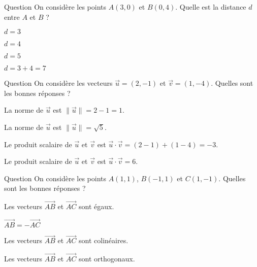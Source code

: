 

\begin{multi}[multiple,feedback=
{D'abord, \(\overrightarrow{AB}=(-3,4)\). Donc \(d=\sqrt{(-3)^2+4^2}=\sqrt{25}=5\).
}]{Question}
On considère les points \(A(3,0)\) et \(B(0,4)\). Quelle est la distance \(d\) entre \(A\) et \(B\) ?

    \item \(d=3\)
    \item \(d=4\)
    \item* \(d=5\)
    \item \(d=3+4=7\)
\end{multi}


\begin{multi}[multiple,feedback=
{Penser aux définitions : si \(\vec{u}=(x,y)\) et \(\vec{v}=(x',y')\) alors
\(\vec{u}\cdot \vec{v} = xx'+yy'\) et \(\|\vec{u}\| = \sqrt{\vec{u}\cdot \vec{u}}
= \sqrt{x^2+y^2}\).
}]{Question}
On considère les vecteurs \(\vec{u}=(2,-1)\) et \(\vec{v}=(1,-4)\). Quelles sont les bonnes réponses ?

    \item La norme de \(\vec{u}\) est \(\|\vec{u}\|=2-1=1\).
    \item* La norme de \(\vec{u}\) est \(\|\vec{u}\|=\sqrt{5}\).
    \item Le produit scalaire de \(\vec{u}\) et \(\vec{v}\) est \(\vec{u}\cdot \vec{v}=(2-1)+(1-4)=-3\).
    \item* Le produit scalaire de \(\vec{u}\) et \(\vec{v}\) est \(\vec{u}\cdot \vec{v}=6\).
\end{multi}


\begin{multi}[multiple,feedback=
{D'abord, \(\overrightarrow{AB}=(-2,0)\) et \(\overrightarrow{AC}=(0,-2)\), et puis le produit scalaire \(\overrightarrow{AB}\cdot\overrightarrow{AC}\) est nul. Donc \(\overrightarrow{AB}\) et \(\overrightarrow{AC}\) sont orthogonaux.
}]{Question}
On considère les points \(A(1,1)\), \(B(-1,1)\) et \(C(1,-1)\). Quelles sont les bonnes réponses ?

    \item Les vecteurs \(\overrightarrow{AB}\) et \(\overrightarrow{AC}\) sont égaux.
    \item \(\overrightarrow{AB}=-\overrightarrow{AC}\)
    \item Les vecteurs \(\overrightarrow{AB}\) et \(\overrightarrow{AC}\) sont colinéaires.
    \item* Les vecteurs \(\overrightarrow{AB}\) et \(\overrightarrow{AC}\) sont orthogonaux.
\end{multi}



